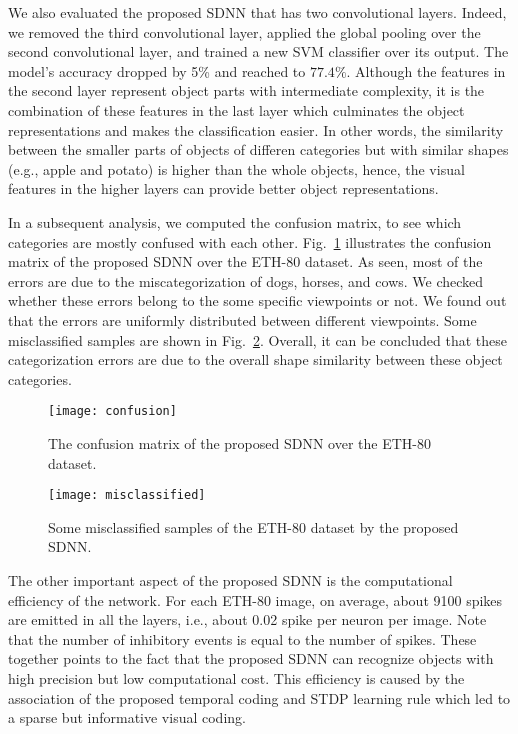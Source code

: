 \documentclass[preprint,5p,12pt,twocolumn]{article}
\begin{document}
We also evaluated the proposed SDNN that has two convolutional layers. Indeed, we removed the third convolutional layer, applied the global pooling over the second convolutional layer, and trained a new SVM classifier over its output. The model's accuracy dropped by 5\% and reached to $77.4\%$. Although the features in the second layer represent object parts with intermediate complexity, it is the combination of these features in the last layer which culminates the object representations and makes the classification easier. In other words, the  similarity between the smaller parts of objects of differen categories but with similar shapes (e.g., apple and potato) is higher than the whole objects, hence, the visual features in the higher layers can provide better object representations.   



In a subsequent analysis, we computed the confusion matrix, to see which categories are mostly confused with each other. Fig.~\ref{figure4} illustrates the confusion matrix of the proposed SDNN over the ETH-80 dataset. As seen, most of the errors are due to the miscategorization of dogs, horses, and cows. We checked whether these errors belong to the some specific viewpoints or not. We found out that the errors are uniformly distributed between different viewpoints. Some misclassified samples are shown in Fig.~\ref{figure4_2}. Overall, it can be concluded that these categorization errors are due to the overall shape similarity between these object categories. 

\begin{figure}[!t]
\centering
\texttt{[image: confusion]}
\caption{ The confusion matrix of the proposed SDNN over the ETH-80 dataset.}
\label{figure4}
\end{figure}

\begin{figure}[!t]
\centering
\texttt{[image: misclassified]}
\caption{ Some misclassified samples of the ETH-80 dataset by the proposed SDNN.}
\label{figure4_2}
\end{figure}

The other important aspect of the proposed SDNN is the computational efficiency of the network. For each ETH-80 image, on average, about 9100 spikes are emitted in all the layers, i.e., about 0.02 spike per neuron per image. Note that the number of inhibitory events is equal to the number of spikes. These together points to the fact that the proposed SDNN can recognize objects with high precision but low computational cost. This efficiency is caused by the association of the proposed temporal coding and STDP learning rule which led to a sparse but informative visual coding. 
\end{document}
